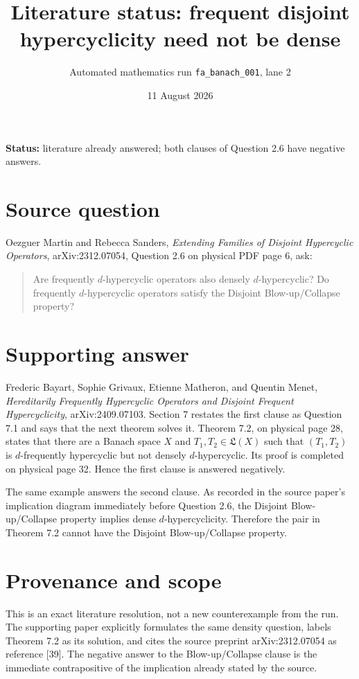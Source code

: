 \documentclass[11pt]{article}
\title{Literature status: frequent disjoint hypercyclicity need not be dense}
\author{Automated mathematics run \texttt{fa\_banach\_001}, lane 2}
\date{11 August 2026}
\begin{document}
\maketitle

\noindent\textbf{Status:} literature already answered; both clauses of
Question 2.6 have negative answers.

\section*{Source question}
Oezguer Martin and Rebecca Sanders,
\emph{Extending Families of Disjoint Hypercyclic Operators},
arXiv:2312.07054, Question 2.6 on physical PDF page 6, ask:
\begin{quote}
Are frequently $d$-hypercyclic operators also densely $d$-hypercyclic? Do
frequently $d$-hypercyclic operators satisfy the Disjoint Blow-up/Collapse
property?
\end{quote}

\section*{Supporting answer}
Frederic Bayart, Sophie Grivaux, Etienne Matheron, and Quentin Menet,
\emph{Hereditarily Frequently Hypercyclic Operators and Disjoint Frequent
Hypercyclicity}, arXiv:2409.07103.  Section 7 restates the first clause as
Question 7.1 and says that the next theorem solves it.  Theorem 7.2, on
physical page 28, states that there are a Banach space $X$ and
$T_1,T_2\in\mathfrak L(X)$ such that $(T_1,T_2)$ is $d$-frequently
hypercyclic but not densely $d$-hypercyclic.  Its proof is completed on
physical page 32.  Hence the first clause is answered negatively.

The same example answers the second clause.  As recorded in the source
paper's implication diagram immediately before Question 2.6, the Disjoint
Blow-up/Collapse property implies dense $d$-hypercyclicity.  Therefore the
pair in Theorem 7.2 cannot have the Disjoint Blow-up/Collapse property.

\section*{Provenance and scope}
This is an exact literature resolution, not a new counterexample from the
run.  The supporting paper explicitly formulates the same density question,
labels Theorem 7.2 as its solution, and cites the source preprint
arXiv:2312.07054 as reference [39].  The negative answer to the
Blow-up/Collapse clause is the immediate contrapositive of the implication
already stated by the source.
\end{document}
